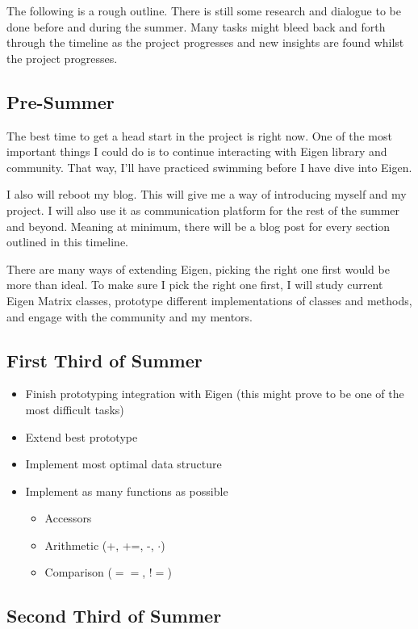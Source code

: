 \documentclass[aps,prl,reprint,groupedaddress,nofootinbib]{revtex4-1}
\begin{document}
The following is a rough outline.
There is still some research and dialogue to be done before and during the summer.
Many tasks might bleed back and forth through the timeline as the project progresses
and new insights are found whilst the project progresses.

\subsection{Pre-Summer}
\label{sec:org26344dd}
The best time to get a head start in the project is right now.
One of the most important things I could do
is to continue interacting with Eigen library and community.
That way, I'll have practiced swimming before I have dive into Eigen.

I also will reboot my blog.
This will give me a way of introducing myself and my project.
I will also use it as communication platform for the rest of the summer and beyond.
Meaning at minimum, there will be a blog post for every section outlined in this timeline.

There are many ways of extending Eigen,
picking the right one first would be more than ideal.
To make sure I pick the right one first, I will study current Eigen Matrix classes,
prototype different implementations of classes and methods,
and engage with the community and my mentors.

\subsection{First Third of Summer}
\label{sec:orgbf08b9f}

\begin{itemize}
\item Finish prototyping integration with Eigen (this might prove to be one of the most difficult tasks)
\item Extend best prototype
\item Implement most optimal data structure
\item Implement as many functions as possible 
\begin{itemize}
\item Accessors
\item Arithmetic (+, +=, -, \(\cdot\))
\item Comparison (\(==\), \(!=\))
\end{itemize}
\end{itemize}

\subsection{Second Third of Summer}
\label{sec:org476deb8}
\end{document}
